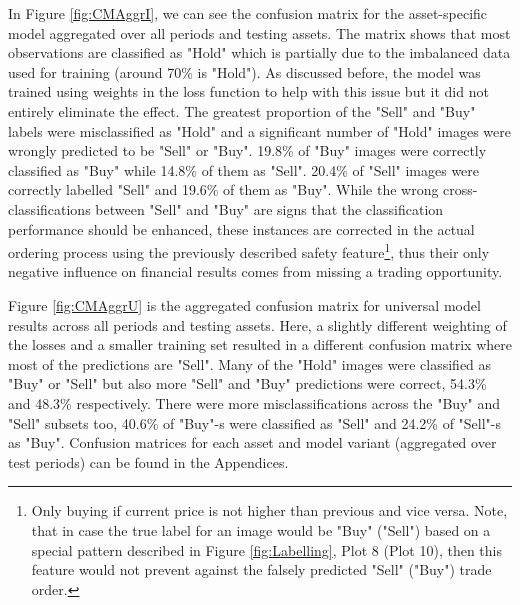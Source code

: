 \documentclass[11pt, a4paper]{article}
\begin{document}
In Figure \ref{fig:CMAggrI}, we can see the confusion matrix for the asset-specific model aggregated over all periods and testing assets. The matrix shows that most observations are classified as "Hold" which is partially due to the imbalanced data used for training (around 70\% is "Hold"). As discussed before, the model was trained using weights in the loss function to help with this issue but it did not entirely eliminate the effect. The greatest proportion of the "Sell" and "Buy" labels were misclassified as "Hold" and a significant number of "Hold" images were wrongly predicted to be "Sell" or "Buy". 19.8\% of "Buy" images were correctly classified as "Buy" while 14.8\% of them as "Sell". 20.4\% of "Sell" images were correctly labelled "Sell" and 19.6\% of them as "Buy". While the wrong cross-classifications between "Sell" and "Buy" are signs that the classification performance should be enhanced, these instances are corrected in the actual ordering process using the previously described safety feature\footnote{Only buying if current price is not higher than previous and vice versa. Note, that in case the true label for an image would be "Buy" ("Sell") based on a special pattern described in Figure \ref{fig:Labelling}, Plot 8 (Plot 10), then this feature would not prevent against the falsely predicted "Sell" ("Buy") trade order.}, thus their only negative influence on financial results comes from missing a trading opportunity.

Figure \ref{fig:CMAggrU} is the aggregated confusion matrix for universal model results across all periods and testing assets. Here, a slightly different weighting of the losses and a smaller training set resulted in a different confusion matrix where most of the predictions are "Sell". Many of the "Hold" images were classified as "Buy" or "Sell" but also more "Sell" and "Buy" predictions were correct, 54.3\% and 48.3\% respectively. There were more misclassifications across the "Buy" and "Sell" subsets too, 40.6\% of "Buy"-s were classified as "Sell" and 24.2\% of "Sell"-s as "Buy". Confusion matrices for each asset and model variant (aggregated over test periods) can be found in the Appendices.
\end{document}
